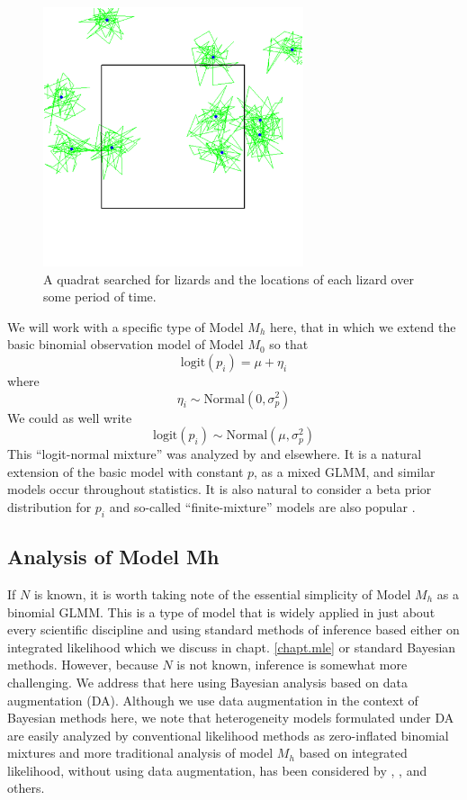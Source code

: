 \begin{figure}
\begin{center}
\includegraphics[height=3in]{Ch3/figs/quadrat}
\end{center}
\caption{A quadrat searched for lizards and the locations of each
  lizard over some period of time.}
\label{closed.fig.quadrat}
\end{figure}

We will work with a specific type of Model $M_{h}$ here, that in which
we extend the basic binomial observation model of Model $M_{0}$ so
that
\[
\mbox{logit}(p_{i}) = \mu + \eta_{i}
\]
where
\[
\eta_{i} \sim \mbox{Normal}(0, \sigma_{p}^2)
\]
We could as well write
\[
\mbox{logit}(p_{i}) \sim \mbox{Normal}(\mu,\sigma_{p}^2)
\]
This ``logit-normal mixture'' was analyzed by
\citet{coull_agresti:1999} and elsewhere. It is a natural extension of
the basic model with constant $p$, as a mixed GLMM, and similar models
occur throughout statistics. It is also natural to consider a beta
prior distribution for $p_{i}$ \citep{dorazio_royle:2003} and
so-called ``finite-mixture'' models are also popular
\citep{norris_pollock:1996, pledger:2000}.

\subsection{Analysis of Model Mh}

If $N$ is known, it is worth taking note of the essential simplicity
of Model $M_h$ as a binomial GLMM.  This is a type of model that is
widely applied in just about every scientific discipline and using
standard methods of inference based either on integrated likelihood
\citep{laird_ware:1982, berger_etal:1999} which we discuss in
chapt. \ref{chapt.mle} or standard Bayesian
methods. However, because $N$ is not known, inference is somewhat more
challenging. We address that here using Bayesian analysis based on
data augmentation (DA). Although we use data augmentation in the context of
Bayesian methods here, we note that
heterogeneity models formulated under DA are easily analyzed by
conventional likelihood methods as zero-inflated binomial mixtures
\citep{royle:2006} and more traditional analysis of model $M_h$ based on
integrated likelihood, without using data augmentation, has been
considered by \citet{coull_agresti:1999}, \citet{dorazio_royle:2003},
and others.


